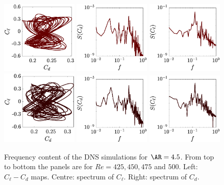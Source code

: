 \begin{figure}
  \includegraphics[width=0.325\textwidth]{./fig/AR4p5/Cl_Cd_Re475.eps}
  \includegraphics[width=0.325\textwidth]{./fig/AR4p5/Cd_f_Re475.eps}
  \includegraphics[width=0.325\textwidth]{./fig/AR4p5/Cl_f_Re475.eps}     
  \includegraphics[width=0.325\textwidth]{./fig/AR4p5/Cl_Cd_Re500.eps}
  \includegraphics[width=0.325\textwidth]{./fig/AR4p5/Cd_f_Re500.eps}
  \includegraphics[width=0.325\textwidth]{./fig/AR4p5/Cl_f_Re500.eps}      
  \caption{Frequency content of the DNS simulations for $\AR=4.5$. From top to bottom the panels are for $Re=425,450,475$ and $500$. Left: $C_\ell-C_d$ maps. Centre: spectrum of $C_\ell$. Right: spectrum of $C_d$.}
  \label{fig:clcddns-ar4p5}
\end{figure} 


